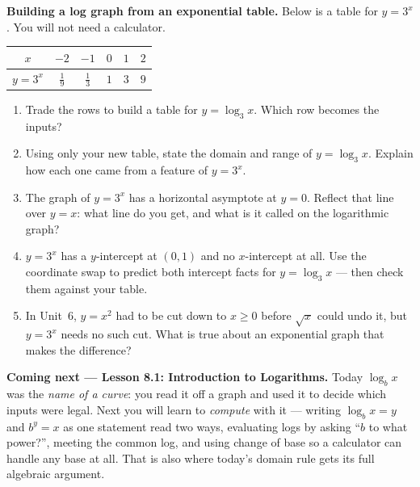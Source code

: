 \documentclass[10pt]{article}
\begin{document}
\begin{extensionbox}
\textbf{Building a log graph from an exponential table.} Below is a table for $y=3^x$. You will not
need a calculator.
\begin{center}
\renewcommand{\arraystretch}{1.25}
\begin{tabular}{|c|c|c|c|c|c|}
\hline
$x$ & $-2$ & $-1$ & $0$ & $1$ & $2$ \\ \hline
$y=3^x$ & $\tfrac19$ & $\tfrac13$ & $1$ & $3$ & $9$ \\ \hline
\end{tabular}
\end{center}
\begin{enumerate}[label=(\alph*), leftmargin=1.8em, itemsep=5pt]
  \item Trade the rows to build a table for $y=\log_3 x$. Which row becomes the inputs?
  \item Using only your new table, state the domain and range of $y=\log_3 x$. Explain how each one
        came from a feature of $y=3^x$.
  \item The graph of $y=3^x$ has a horizontal asymptote at $y=0$. Reflect that line over $y=x$: what
        line do you get, and what is it called on the logarithmic graph?
  \item $y=3^x$ has a $y$-intercept at $(0,1)$ and no $x$-intercept at all. Use the coordinate swap
        to predict both intercept facts for $y=\log_3 x$ --- then check them against your table.
  \item In Unit~6, $y=x^2$ had to be cut down to $x\ge 0$ before $\sqrt{x}$ could undo it, but
        $y=3^x$ needs no such cut. What is true about an exponential graph that makes the difference?
\end{enumerate}
\end{extensionbox}

\begin{spiralbox}
\textbf{Coming next --- Lesson 8.1: Introduction to Logarithms.} Today $\log_b x$ was the
\emph{name of a curve}: you read it off a graph and used it to decide which inputs were legal. Next
you will learn to \emph{compute} with it --- writing $\log_b x = y$ and $b^y = x$ as one statement
read two ways, evaluating logs by asking ``$b$ to what power?'', meeting the common log, and using
change of base so a calculator can handle any base at all. That is also where today's domain rule
gets its full algebraic argument.
\end{spiralbox}
\end{document}
